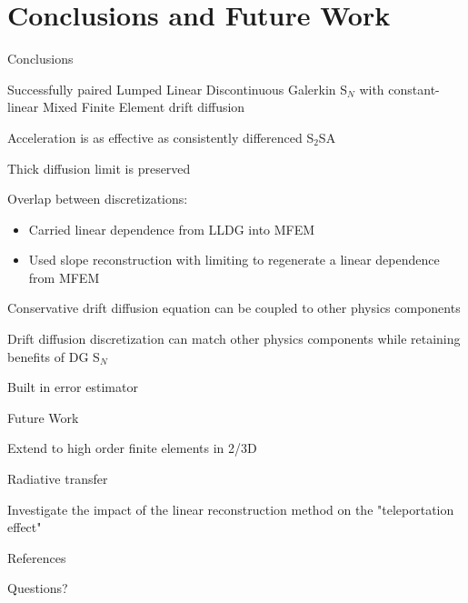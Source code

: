 \documentclass[10pt]{beamer}
\newcommand{\SN}{S$_N$\xspace}
\begin{document}
\section{Conclusions and Future Work }

\begin{frame}{Conclusions}

	Successfully paired Lumped Linear Discontinuous Galerkin \SN with constant-linear Mixed Finite Element drift diffusion 

	Acceleration is as effective as consistently differenced S$_2$SA 

	Thick diffusion limit is preserved 

	Overlap between discretizations:
	\begin{itemize}
		\item Carried linear dependence from LLDG into MFEM 

		\item Used slope reconstruction with limiting to regenerate a linear dependence from MFEM 

	\end{itemize}

	Conservative drift diffusion equation can be coupled to other physics components

	Drift diffusion discretization can match other physics components while retaining benefits of DG \SN 

	Built in error estimator 

\end{frame}

\begin{frame}{Future Work}

	Extend to high order finite elements in 2/3D 

	Radiative transfer 

	Investigate the impact of the linear reconstruction method on the "teleportation effect"

\end{frame}


\appendix

\begin{frame}[allowframebreaks]{References}

	\nocite{*}
	
	

\end{frame}

\begin{frame}[standout]
  Questions?
\end{frame}
\end{document}

